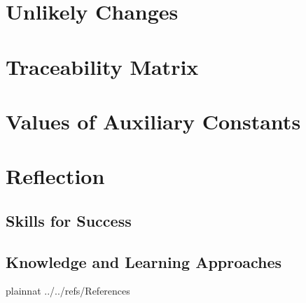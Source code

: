 \documentclass[12pt]{article}
\begin{document}
\section{Unlikely Changes}

\section{Traceability Matrix}

\appendix
\section{Values of Auxiliary Constants}

\newpage

\appendix
\section{Reflection}
\subsection{Skills for Success}
\subsection{Knowledge and Learning Approaches}

\newpage

 {plainnat}
 {../../refs/References}
\end{document}
